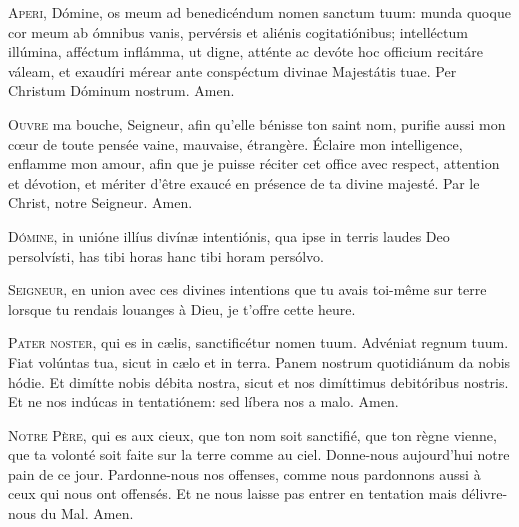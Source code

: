 \documentclass[psautier_nocturne_fr.tex]{subfiles}
\begin{document}


\begin{paracol}{2}
\lettrine{A}{peri}, Dómine, os meum ad benedicéndum nomen sanctum tuum: munda quoque cor meum ab ómnibus vanis, pervérsis et aliénis 
cogitatiónibus; intelléctum illúmina, afféctum inflámma, ut digne, atténte ac devóte hoc officium recitáre váleam, et exaudíri mérear
ante conspéctum divinae Majestátis tuae. Per Christum Dóminum nostrum. Amen.

\switchcolumn

\lettrine{O}{uvre} ma bouche, Seigneur, afin qu’elle bénisse ton saint nom, purifie aussi mon cœur de toute pensée
vaine, mauvaise, étrangère. Éclaire mon intelligence, enflamme mon amour,
afin que je puisse réciter cet office avec respect, attention et dévotion, et mériter d’être exaucé en
présence de ta divine majesté. Par le Christ, notre Seigneur. Amen.

\switchcolumn*

\lettrine{D}{ómine}, in unióne illíus divínæ intentiónis, qua ipse in terris laudes Deo persolvísti, has tibi horas  hanc tibi horam\rubric{)} persólvo.

\switchcolumn

\lettrine{S}{eigneur}, en union avec ces divines intentions que tu avais toi-même sur terre lorsque
tu rendais louanges à Dieu, je t’offre cette heure.

\switchcolumn*

\lettrine{P}{ater noster}, qui es in cælis, sanctificétur nomen tuum. Advéniat regnum tuum. Fiat volúntas tua, sicut in cælo et in terra.
Panem nostrum quotidiánum da nobis hódie. Et dimítte nobis débita nostra, sicut et nos dimíttimus debitóribus nostris. Et ne nos
indúcas in tentatiónem: sed líbera nos a malo. Amen.

\switchcolumn

\lettrine{N}{otre Père}, qui es aux cieux, que ton nom soit sanctifié, que ton règne vienne,
que ta volonté soit faite sur la terre comme au ciel.
Donne-nous aujourd’hui notre pain de ce jour. Pardonne-nous nos offenses, comme nous pardonnons aussi à ceux qui nous ont offensés.
Et ne nous laisse pas entrer en tentation mais délivre-nous du Mal. Amen.

\switchcolumn*


\end{paracol}
\end{document}
